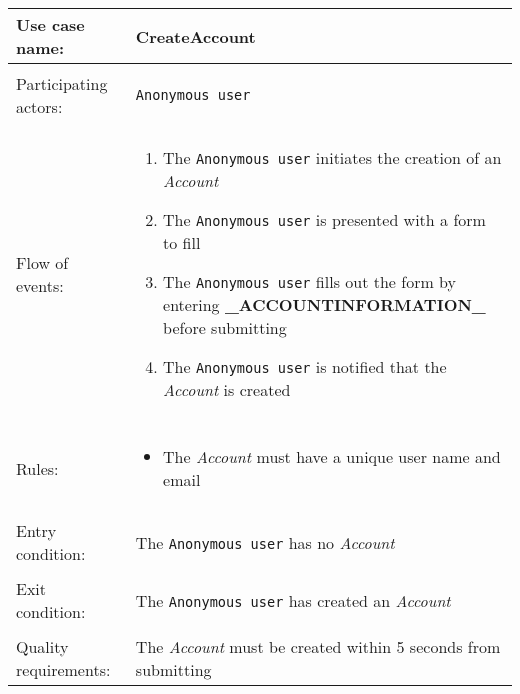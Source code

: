 \documentclass[../report.tex]{subfiles}
\begin{document}
\noindent
\begin{tabular}{ l p{8cm} }                        
 Use case name:  & CreateAccount   \\   \hline  \\              
 Participating actors:  & \texttt{Anonymous user} \\   \hline \\
 Flow of events: & \begin{enumerate}
\item{The \texttt{Anonymous user} initiates the creation of an \textit{Account}}
\item{The \texttt{Anonymous user} is presented with a form to fill}
\item{The \texttt{Anonymous user} fills out the form by entering \textbf{\_ACCOUNTINFORMATION\_} before submitting} %
\item{The \texttt{Anonymous user} is notified that the \textit{Account} is created}
\end{enumerate}
 \\   \hline \\
 Rules: & \begin{itemize}
 \item{The \textit{Account} must have a unique user name and email}
 \end{itemize} \\ \hline \\
 Entry condition: & The \texttt{Anonymous user} has no \textit{Account} \\ \hline \\
 Exit condition: & The \texttt{Anonymous user} has created an \textit{Account} \\ \hline \\
Quality requirements: & The \textit{Account} must be created within 5 seconds from submitting \\  \hline      
\end{tabular} \\
\end{document}
